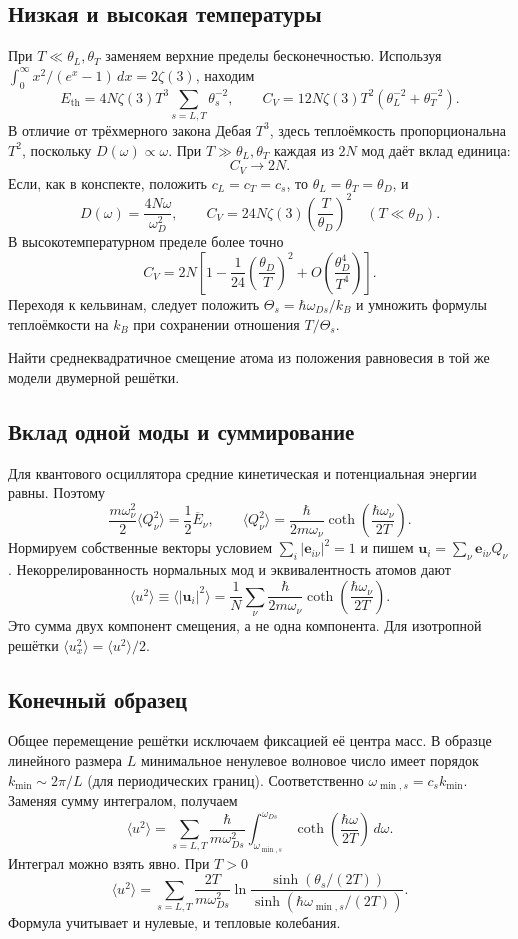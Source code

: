 \documentclass[../final.tex]{subfiles}
\begin{document}
\subsection*{Низкая и высокая температуры}
При $T\ll\theta_L,\theta_T$ заменяем верхние пределы бесконечностью.
Используя $\int_0^\infty x^2/(e^x-1)\,dx=2\zeta(3)$, находим
\[
 E_{\mathrm{th}}=4N\zeta(3)T^3\sum_{s=L,T}\theta_s^{-2},
 \qquad
 \boxed{C_V=12N\zeta(3)T^2\left(\theta_L^{-2}+\theta_T^{-2}\right)}.
\]
В отличие от трёхмерного закона Дебая $T^3$, здесь теплоёмкость
пропорциональна $T^2$, поскольку $D(\omega)\propto\omega$.
При $T\gg\theta_L,\theta_T$ каждая из $2N$ мод даёт вклад единица:
\[
 \boxed{C_V\longrightarrow2N}.
\]
Если, как в конспекте, положить $c_L=c_T=c_s$,
то $\theta_L=\theta_T=\theta_D$, и
\[
 D(\omega)=\frac{4N\omega}{\omega_D^2},\qquad
 \boxed{C_V=24N\zeta(3)\left(\frac{T}{\theta_D}\right)^2
 \quad(T\ll\theta_D)}.
\]
В высокотемпературном пределе более точно
\[
 C_V=2N\left[1-\frac1{24}\left(\frac{\theta_D}{T}\right)^2
 +O\left(\frac{\theta_D^4}{T^4}\right)\right].
\]
Переходя к кельвинам, следует положить
$\Theta_s=\hbar\omega_{Ds}/k_B$ и умножить формулы теплоёмкости
на $k_B$ при сохранении отношения $T/\Theta_s$.

\clearpage
{}
\condition
Найти среднеквадратичное смещение атома из положения равновесия
в той же модели двумерной решётки.

\subsection*{Вклад одной моды и суммирование}
Для квантового осциллятора средние кинетическая и потенциальная
энергии равны. Поэтому
\[
 \frac{m\omega_\nu^2}{2}\langle Q_\nu^2\rangle
 =\frac12\overline E_\nu,\qquad
 \langle Q_\nu^2\rangle
 =\frac{\hbar}{2m\omega_\nu}
 \coth\left(\frac{\hbar\omega_\nu}{2T}\right).
\]
Нормируем собственные векторы условием
$\sum_i|\boldsymbol e_{i\nu}|^2=1$ и пишем
$\boldsymbol u_i=\sum_\nu\boldsymbol e_{i\nu}Q_\nu$.
Некоррелированность нормальных мод и эквивалентность атомов дают
\[
 \langle u^2\rangle\equiv\langle|\boldsymbol u_i|^2\rangle
 =\frac1N\sum_\nu\frac{\hbar}{2m\omega_\nu}
 \coth\left(\frac{\hbar\omega_\nu}{2T}\right).
\]
Это сумма двух компонент смещения, а не одна компонента.
Для изотропной решётки $\langle u_x^2\rangle=\langle u^2\rangle/2$.

\subsection*{Конечный образец}
Общее перемещение решётки исключаем фиксацией её центра масс.
В образце линейного размера $L$ минимальное ненулевое волновое
число имеет порядок $k_{\min}\sim2\pi/L$ (для периодических границ).
Соответственно $\omega_{\min,s}=c_sk_{\min}$.
Заменяя сумму интегралом, получаем
\[
 \langle u^2\rangle=
 \sum_{s=L,T}\frac{\hbar}{m\omega_{Ds}^2}
 \int_{\omega_{\min,s}}^{\omega_{Ds}}
 \coth\left(\frac{\hbar\omega}{2T}\right)\,d\omega.
\]
Интеграл можно взять явно. При $T>0$
\[
 \boxed{\langle u^2\rangle=
 \sum_{s=L,T}\frac{2T}{m\omega_{Ds}^2}
 \ln\frac{\sinh(\theta_s/(2T))}
 {\sinh(\hbar\omega_{\min,s}/(2T))}}.
\]
Формула учитывает и нулевые, и тепловые колебания.
\end{document}
